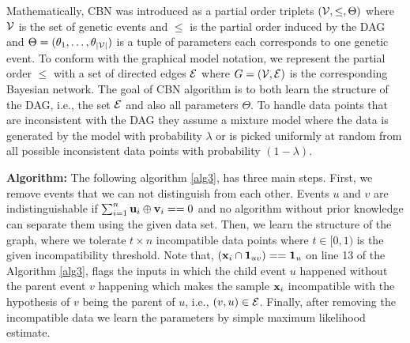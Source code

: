 	Mathematically, CBN was introduced \cite{beerenwinkel07} as a partial order triplets $({\cal V}, \leq, \Theta)$ where ${\cal V}$ is the set of genetic events and $\leq$ is the partial order induced by the DAG and $\Theta = (\theta_1, \dots, \theta_{|{\cal V}|} )$ is a tuple of parameters each corresponds to one genetic event. 
	To conform with the graphical model notation, we represent the partial order $\leq$ with a set of directed edges ${\cal E}$ where $G = ({\cal V}, {\cal E})$ is the corresponding Bayesian network. 
	The goal of CBN algorithm is to both learn the structure of the DAG, i.e., the set ${\cal E}$ and also all parameters $\Theta$. 	
	To handle data points that are inconsistent with the DAG they assume a mixture model where the data is generated by the model with probability $\lambda$ or is picked uniformly at random from all possible inconsistent data points with probability $(1 - \lambda)$. 
	
	{\bf Algorithm:}
	The following algorithm \ref{alg3}, has three main steps. 
	First, we remove events that we can not distinguish from each other.  
	Events $u$ and $v$ are indistinguishable if $\sum_{i = 1}^{n} \mathbf{u}_i \oplus \mathbf{v}_i == 0$ and no algorithm without prior knowledge can separate them using the given data set.
	Then, we learn the structure of the graph, where we tolerate $t \times n$ incompatible data points where $t \in [0,1)$ is the given incompatibility threshold. 
	Note that, $(\mathbf{x}_i \cap {\large \bf 1}_{uv}) == {\large \bf 1}_{u}$ on line 13 of the Algorithm \ref{alg3}, flags the inputs in which the child event $u$ happened without the parent event $v$ happening which makes the sample $\mathbf{x}_i$ incompatible with the hypothesis of $v$ being the parent of $u$, i.e., $(v, u) \in {\cal E}$. 
	Finally, after removing the incompatible data we learn the parameters by simple maximum likelihood estimate. 
	
